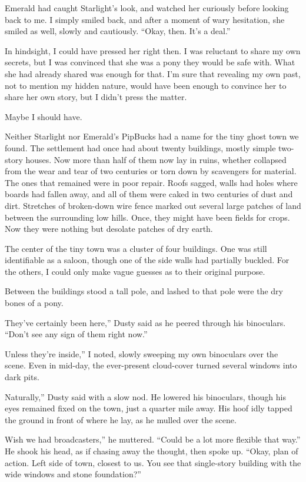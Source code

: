 Emerald had caught Starlight’s look, and watched her curiously before looking back to me. I simply smiled back, and after a moment of wary hesitation, she smiled as well, slowly and cautiously. “Okay, then. It’s a deal.”

In hindsight, I could have pressed her right then. I was reluctant to share my own secrets, but I was convinced that she was a pony they would be safe with. What she had already shared was enough for that. I’m sure that revealing my own past, not to mention my hidden nature, would have been enough to convince her to share her own story, but I didn’t press the matter.

Maybe I should have.

{\br}%
Neither Starlight nor Emerald’s PipBucks had a name for the tiny ghost town we found. The settlement had once had about twenty buildings, mostly simple two-story houses. Now more than half of them now lay in ruins, whether collapsed from the wear and tear of two centuries or torn down by scavengers for material. The ones that remained were in poor repair. Roofs sagged, walls had holes where boards had fallen away, and all of them were caked in two centuries of dust and dirt. Stretches of broken-down wire fence marked out several large patches of land between the surrounding low hills. Once, they might have been fields for crops. Now they were nothing but desolate patches of dry earth.

The center of the tiny town was a cluster of four buildings. One was still identifiable as a saloon, though one of the side walls had partially buckled. For the others, I could only make vague guesses as to their original purpose.

Between the buildings stood a tall pole, and lashed to that pole were the dry bones of a pony.

\leavevmode{}They’ve certainly been here,” Dusty said as he peered through his binoculars. “Don’t see any sign of them right now.”

\leavevmode{}Unless they’re inside,” I noted, slowly sweeping my own binoculars over the scene. Even in mid-day, the ever-present cloud-cover turned several windows into dark pits.

\leavevmode{}Naturally,” Dusty said with a slow nod. He lowered his binoculars, though his eyes remained fixed on the town, just a quarter mile away. His hoof idly tapped the ground in front of where he lay, as he mulled over the scene.

\leavevmode{}Wish we had broadcasters,” he muttered. “Could be a lot more flexible that way.” He shook his head, as if chasing away the thought, then spoke up. “Okay, plan of action. Left side of town, closest to us. You see that single-story building with the wide windows and stone foundation?”

